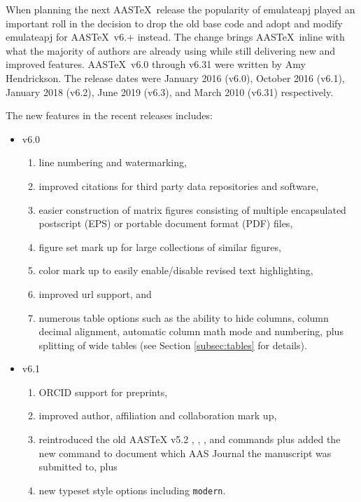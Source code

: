 \documentclass[linenumbers]{aastex631}
\newcommand\aastex{AAS\TeX}
\begin{document}
When planning the next \aastex\ release the popularity of emulateapj played
an important roll in the decision to drop the old base code and adopt and
modify emulateapj for \aastex\ v6.+ instead.  The change brings \aastex\
inline with what the majority of authors are already using while still
delivering new and improved features.  \aastex\ v6.0 through v6.31 were
written by Amy Hendrickson. The release dates were January 2016 (v6.0),
October 2016 (v6.1), January 2018 (v6.2), June 2019 (v6.3), and March 2010
(v6.31) respectively.

The new features in the recent releases includes:

\begin{itemize}
 \item{v6.0}
   \begin{enumerate}
      \item line numbering and watermarking,
      \item improved citations for third party data repositories and software,
      \item easier construction of matrix figures consisting of multiple 
encapsulated postscript (EPS) or portable document format (PDF) files,
      \item figure set mark up for large collections of similar figures,
      \item color mark up to easily enable/disable revised text highlighting,
      \item improved url support, and
      \item numerous table options such as the ability to hide columns, column decimal alignment, automatic column math mode and numbering, plus splitting of wide tables (see Section \ref{subsec:tables} for details).
    \end{enumerate}
  \item{v6.1}
    \begin{enumerate}
      \item ORCID support for preprints,
      \item improved author, affiliation and collaboration mark up,
      \item reintroduced the old AASTeX v5.2 {\tt\string\received}, {\tt\string\revised}, {\tt\string\accepted}, and {\tt\string\published} commands plus added the new {\tt\string\submitjournal} command to document which AAS Journal the manuscript was submitted to, plus
      \item new typeset style options including {\tt\string modern}.
    \end{enumerate}

\end{itemize}
\end{document}
